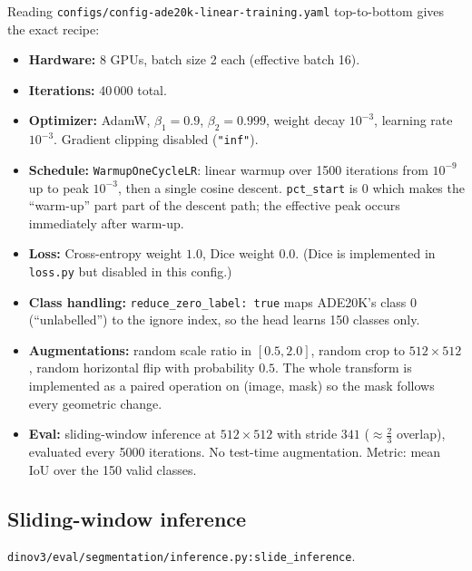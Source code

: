 \documentclass[11pt,a4paper]{article}
\begin{document}
Reading \texttt{configs/config-ade20k-linear-training.yaml} top-to-bottom
gives the exact recipe:
\begin{itemize}[leftmargin=1.6em,itemsep=0pt]
  \item \textbf{Hardware:} 8 GPUs, batch size 2 each (effective batch 16).
  \item \textbf{Iterations:} 40\,000 total.
  \item \textbf{Optimizer:} AdamW, $\beta_1{=}0.9$, $\beta_2{=}0.999$,
        weight decay $10^{-3}$, learning rate $10^{-3}$. Gradient clipping
        disabled (\texttt{"inf"}).
  \item \textbf{Schedule:} \texttt{WarmupOneCycleLR}: linear warmup over
        1500 iterations from $10^{-9}$ up to peak $10^{-3}$, then a single
        cosine descent. \texttt{pct\_start} is $0$ which makes the
        ``warm-up'' part part of the descent path; the effective peak
        occurs immediately after warm-up.
  \item \textbf{Loss:} Cross-entropy weight $1.0$, Dice weight $0.0$.
        (Dice is implemented in \texttt{loss.py} but disabled in this
        config.)
  \item \textbf{Class handling:} \texttt{reduce\_zero\_label: true} maps
        ADE20K's class 0 (``unlabelled'') to the ignore index, so the
        head learns 150 classes only.
  \item \textbf{Augmentations:} random scale ratio in $[0.5, 2.0]$,
        random crop to $512{\times}512$, random horizontal flip with
        probability $0.5$. The whole transform is implemented as a paired
        operation on (image, mask) so the mask follows every geometric
        change.
  \item \textbf{Eval:} sliding-window inference at $512{\times}512$ with
        stride $341$ ($\approx \tfrac{2}{3}$ overlap), evaluated every
        5000 iterations. No test-time augmentation. Metric: mean IoU
        over the 150 valid classes.
\end{itemize}

\subsection{Sliding-window inference}
\label{ssec:slide}

\begin{srcbox}
\texttt{dinov3/eval/segmentation/inference.py:slide\_inference}.
\end{srcbox}
\end{document}
